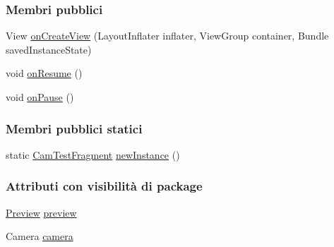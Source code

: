 \subsubsection*{Membri pubblici}
\begin{DoxyCompactItemize}
\item 
View \hyperlink{classit_1_1unibo_1_1torsello_1_1bluetoothpositioning_1_1examplesCamera_1_1CamTestFragment_a197f76a204aaeac1bfb824c41184d12c_a197f76a204aaeac1bfb824c41184d12c}{on\+Create\+View} (Layout\+Inflater inflater, View\+Group container, Bundle saved\+Instance\+State)
\item 
void \hyperlink{classit_1_1unibo_1_1torsello_1_1bluetoothpositioning_1_1examplesCamera_1_1CamTestFragment_a5d9658f3ac7b5ed400a3d4ac6aa62aeb_a5d9658f3ac7b5ed400a3d4ac6aa62aeb}{on\+Resume} ()
\item 
void \hyperlink{classit_1_1unibo_1_1torsello_1_1bluetoothpositioning_1_1examplesCamera_1_1CamTestFragment_ab42acc697b4d94a34ea514a53bc8ce02_ab42acc697b4d94a34ea514a53bc8ce02}{on\+Pause} ()
\end{DoxyCompactItemize}
\subsubsection*{Membri pubblici statici}
\begin{DoxyCompactItemize}
\item 
static \hyperlink{classit_1_1unibo_1_1torsello_1_1bluetoothpositioning_1_1examplesCamera_1_1CamTestFragment}{Cam\+Test\+Fragment} \hyperlink{classit_1_1unibo_1_1torsello_1_1bluetoothpositioning_1_1examplesCamera_1_1CamTestFragment_a90560c7d9a436702707f2e070418e0b7_a90560c7d9a436702707f2e070418e0b7}{new\+Instance} ()
\end{DoxyCompactItemize}
\subsubsection*{Attributi con visibilità di package}
\begin{DoxyCompactItemize}
\item 
\hyperlink{classit_1_1unibo_1_1torsello_1_1bluetoothpositioning_1_1examplesCamera_1_1Preview}{Preview} \hyperlink{classit_1_1unibo_1_1torsello_1_1bluetoothpositioning_1_1examplesCamera_1_1CamTestFragment_ae917d2bc3cab2f7a1641a78cce044fd9_ae917d2bc3cab2f7a1641a78cce044fd9}{preview}
\item 
Camera \hyperlink{classit_1_1unibo_1_1torsello_1_1bluetoothpositioning_1_1examplesCamera_1_1CamTestFragment_ae0d0a876ac5ce037c020f5362d3e1887_ae0d0a876ac5ce037c020f5362d3e1887}{camera}
\end{DoxyCompactItemize}



